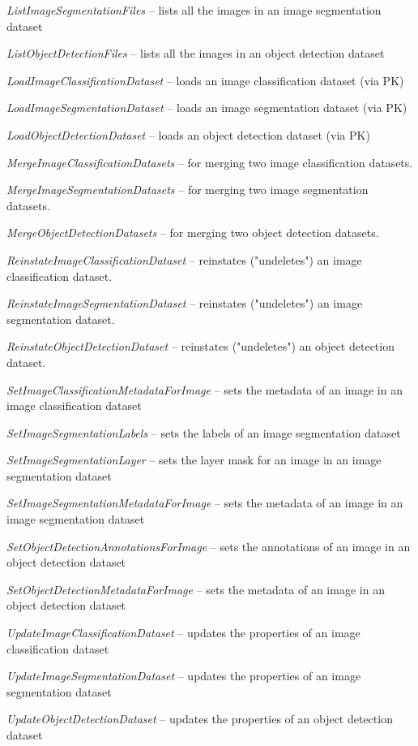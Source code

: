 \documentclass[a4paper]{book}
\begin{document}
\begin{tight_itemize}
  \item \textit{ListImageSegmentationFiles} -- lists all the images in an image segmentation dataset
  \item \textit{ListObjectDetectionFiles} -- lists all the images in an object detection dataset
  \item \textit{LoadImageClassificationDataset} -- loads an image classification dataset (via PK)
  \item \textit{LoadImageSegmentationDataset} -- loads an image segmentation dataset (via PK)
  \item \textit{LoadObjectDetectionDataset} -- loads an object detection dataset (via PK)
  \item \textit{MergeImageClassificationDatasets} -- for merging two image classification datasets.
  \item \textit{MergeImageSegmentationDatasets} -- for merging two image segmentation datasets.
  \item \textit{MergeObjectDetectionDatasets} -- for merging two object detection datasets.
  \item \textit{ReinstateImageClassificationDataset} -- reinstates ("undeletes") an image classification dataset.
  \item \textit{ReinstateImageSegmentationDataset} -- reinstates ("undeletes") an image segmentation dataset.
  \item \textit{ReinstateObjectDetectionDataset} -- reinstates ("undeletes") an object detection dataset.
  \item \textit{SetImageClassificationMetadataForImage} -- sets the metadata of an image in an image classification dataset
  \item \textit{SetImageSegmentationLabels} -- sets the labels of an image segmentation dataset
  \item \textit{SetImageSegmentationLayer} -- sets the layer mask for an image in an image segmentation dataset
  \item \textit{SetImageSegmentationMetadataForImage} -- sets the metadata of an image in an image segmentation dataset
  \item \textit{SetObjectDetectionAnnotationsForImage} -- sets the annotations of an image in an object detection dataset
  \item \textit{SetObjectDetectionMetadataForImage} -- sets the metadata of an image in an object detection dataset
  \item \textit{UpdateImageClassificationDataset} -- updates the properties of an image classification dataset
  \item \textit{UpdateImageSegmentationDataset} -- updates the properties of an image segmentation dataset
  \item \textit{UpdateObjectDetectionDataset} -- updates the properties of an object detection dataset
\end{tight_itemize}
\end{document}
